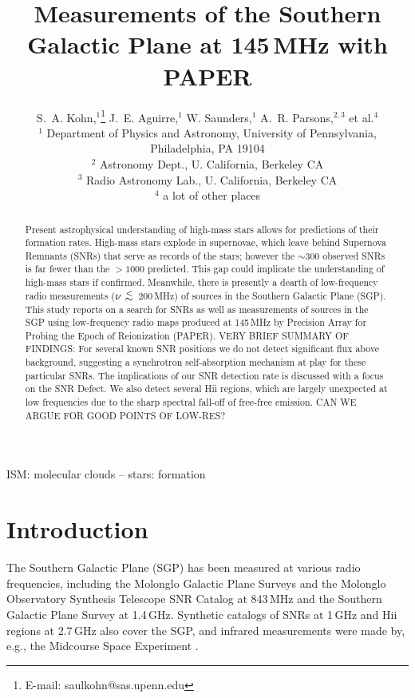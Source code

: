 \documentclass[useAMS,usenatbib]{mn2e}
\title[The SGP at 145\,MHz with PAPER]{Measurements of the Southern Galactic Plane at 145\,MHz with PAPER}
\author[S. A. Kohn et al.]{S.~A. Kohn,$^{1}$\thanks{E-mail: saulkohn@sas.upenn.edu} J.~E. Aguirre,$^{1}$ W. Saunders,$^{1}$
A.~R. Parsons,$^{2,3}$
\newauthor et al.$^4$\\
$^{1}$ Department of Physics and Astronomy, University of Pennsylvania, Philadelphia, PA 19104\\
$^{2}$ Astronomy Dept., U. California, Berkeley CA\\
$^{3}$ Radio Astronomy Lab., U. California, Berkeley CA\\
$^{4}$ a lot of other places\\
}
\newcommand {\aplt} {\ {\raise-.5ex\hbox{$\buildrel<\over\sim$}}\ }
\begin{document}
\date{}

\maketitle
\begin{abstract}
Present astrophysical understanding of high-mass stars allows for predictions of their formation rates.  High-mass stars explode in supernovae, which leave behind Supernova Remnants (SNRs) that serve as records of the stars; however the $\sim$300 observed SNRs is far fewer than the $>1000$ predicted.  This gap could implicate the understanding of high-mass stars if confirmed. 
Meanwhile, there is presently a dearth of low-frequency radio measurements ($\nu\aplt$200\,MHz) of sources in the Southern Galactic Plane (SGP).
This study reports on a search for SNRs as well as measurements of sources in the SGP using low-frequency radio maps produced at 145\,MHz by Precision Array for Probing the Epoch of Reionization (PAPER).
{\color{red} VERY BRIEF SUMMARY OF FINDINGS:} For several known SNR positions we do not detect significant flux above background, suggesting a synchrotron self-absorption mechanism at play for these particular SNRs. The implications of our SNR detection rate is discussed with a focus on the SNR Defect. We also detect several H{\sc ii} regions, which are largely unexpected at low frequencies due to the sharp spectral fall-off of free-free emission.
{\color{blue} CAN WE ARGUE FOR GOOD POINTS OF LOW-RES?}
\end{abstract}

\begin{keywords}
ISM: molecular clouds -- stars: formation
\end{keywords}

\section{Introduction}

The Southern Galactic Plane (SGP) has been measured at various radio frequencies, including the Molonglo Galactic Plane Surveys \citep[MGPS-1 and 2;][]{Green.99,Murphy.07} and the Molonglo Observatory Synthesis Telescope SNR Catalog \citep[MOSTSNRCAT;][]{Whiteoak.96} at 843\,MHz and the Southern Galactic Plane Survey \citep[SGPS;][]{Haverkorn.06} at 1.4\,GHz. Synthetic catalogs of SNRs at 1\,GHz \citep{DAGreen.14} and H{\sc ii} regions at 2.7\,GHz \citep{Paladini.03} also cover the SGP, and infrared measurements were made by, e.g., the Midcourse Space Experiment \citep[MSX;][operating at 8.28--21.3\,$\mu$m (36.23--14.08\,THz)]{Egan.03}. 
\end{document}
